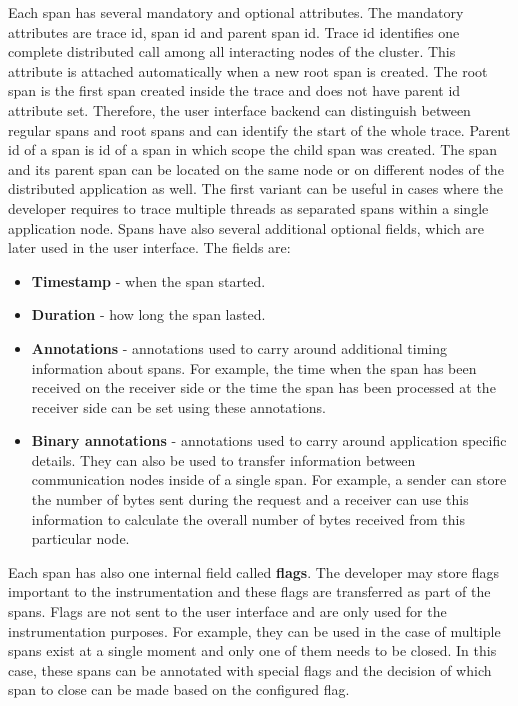 Each span has several mandatory and optional attributes. The mandatory attributes are trace id, span id and parent span id. Trace id identifies one complete distributed call among all interacting nodes of the cluster. This attribute is attached automatically when a new root span is created. The root span is the first span created inside the trace and does not have parent id attribute set. Therefore, the user interface backend can distinguish between regular spans and root spans and can identify the start of the whole trace. Parent id of a span is id of a span in which scope the child span was created. The span and its parent span can be located on the same node or on different nodes of the distributed application as well. The first variant can be useful in cases where the developer requires to trace multiple threads as separated spans within a single application node. Spans have also several additional optional fields, which are later used in the user interface. The fields are:
\begin{itemize}
	\item \textbf{Timestamp} - when the span started.
	\item \textbf{Duration} - how long the span lasted.
	\item \textbf{Annotations} - annotations used to carry around additional timing information about spans. For example, the time when the span has been received on the receiver side or the time the span has been processed at the receiver side can be set using these annotations.
	\item \textbf{Binary annotations} - annotations used to carry around application specific details. They can also be used to transfer information between communication nodes inside of a single span. For example, a sender can store the number of bytes sent during the request and a receiver can use this information to calculate the overall number of bytes received from this particular node.
\end{itemize}
Each span has also one internal field called \textbf{flags}. The developer may store flags important to the instrumentation and these flags are transferred as part of the spans. Flags are not sent to the user interface and are only used for the instrumentation purposes. For example, they can be used in the case of multiple spans exist at a single moment and only one of them needs to be closed. In this case, these spans can be annotated with special flags and the decision of which span to close can be made based on the configured flag.

